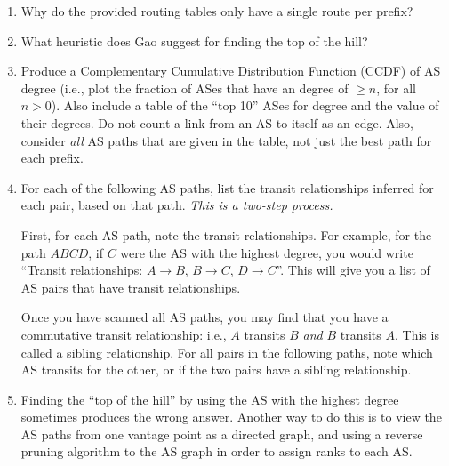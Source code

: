 \documentclass[11pt]{article}
\begin{document}
\begin{enumerate}

\item Why do the provided routing tables only have a single route per
  prefix? 

\item What heuristic does Gao suggest for finding the top of the hill?

\item Produce a Complementary Cumulative Distribution Function (CCDF) of
  AS degree (i.e., plot the fraction of ASes that have an degree of
  $\geq n$, for all $n>0$).  Also include a table of the ``top 10'' ASes
  for degree and the value of their degrees. Do not count a link from an
  AS to itself as an edge.  Also, consider {\em all} AS paths that are
  given in the table, not just the best path for each prefix.

\item For each of the following AS paths, list the transit
relationships inferred for each pair, based on that path.  {\em This is a
two-step process.}

First, for each AS path, note the transit relationships.  For example,
for the path $A B C D$, if $C$ were the AS with the highest degree,
you would write ``Transit relationships: $A\rightarrow B$,
$B\rightarrow C$, $D\rightarrow C$''.  This will give you a list of AS
pairs that have transit relationships.

Once you have scanned all AS paths, you may find that you
have a commutative transit relationship: i.e., $A$ transits $B$ {\em
and} $B$ transits $A$.  This is called a sibling relationship.   For
all pairs in the following paths, note which AS transits for the
other, or if the two pairs have a sibling relationship.

\setcounter{sublistcount}{0}

\item Finding the ``top of the hill'' by using the AS with the highest
degree sometimes produces the wrong answer.  Another way to do this is
to view the AS paths from one vantage point as a directed graph, and
using a reverse pruning algorithm to the AS graph in order to assign
ranks to each AS.


\end{enumerate}
\end{document}
